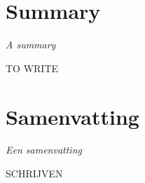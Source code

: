 \chapter*{Summary}

\emph{A summary}

TO WRITE 

\chapter*{Samenvatting}
\emph{Een samenvatting}

SCHRIJVEN

